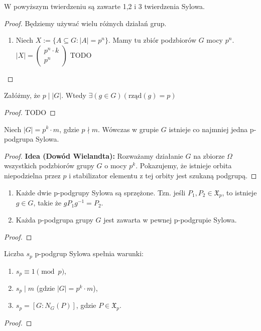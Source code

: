 W powyższym twierdzeniu są zawarte 1,2 i 3 twierdzenia Sylowa.
\begin{proof}
	Będziemy używać wielu różnych działań grup.
	\begin{enumerate}[label=\arabic*.]
		\item Niech $X:= \{A\subseteq G: \left| A \right| = p^{n}\} $. Mamy tu zbiór podzbiorów $G$ mocy $p^{n}$.
			$\left| X \right| = \begin{pmatrix} p^{n}\cdot k \\ p^{n} \end{pmatrix} $ TODO
	\end{enumerate}
\end{proof} 

\begin{theorem}
	Załóżmy, że $p\mid \left| G \right| $. Wtedy $\exists\left( g\in G \right)\left( \text{rząd}\left( g \right) = p\right)  $
\end{theorem} 
\begin{proof}
	TODO
\end{proof} 
\begin{theorem}
    Niech $|G| = p^k \cdot m$, gdzie $p \nmid m$. Wówczas w grupie $G$ istnieje co najmniej jedna p-podgrupa Sylowa.
\end{theorem}
\begin{proof}
    \textbf{Idea (Dowód Wielandta):} Rozważamy działanie $G$ na zbiorze $\Omega$ wszystkich podzbiorów grupy $G$ o mocy $p^k$. Pokazujemy, że istnieje orbita niepodzielna przez $p$ i stabilizator elementu z tej orbity jest szukaną podgrupą.
\end{proof}

\begin{theorem}
    \begin{enumerate}
        \item Każde dwie p-podgrupy Sylowa są sprzężone. Tzn. jeśli $P_1, P_2 \in \mathfrak{X}_p$, to istnieje $g \in G$, takie że $g P_1 g^{-1} = P_2$.
        \item Każda p-podgrupa grupy $G$ jest zawarta w pewnej p-podgrupie Sylowa.
    \end{enumerate}
\end{theorem}
\begin{proof}
\end{proof}

\begin{theorem}
    Liczba $s_p$ p-podgrup Sylowa spełnia warunki:
    \begin{enumerate}
        \item $s_p \equiv 1 \pmod{p}$,
        \item $s_p \mid m$ (gdzie $|G| = p^k \cdot m$),
        \item $s_p = [G : N_G(P)]$, gdzie $P \in \mathfrak{X}_p$.
    \end{enumerate}
\end{theorem}
\begin{proof}
\end{proof}

